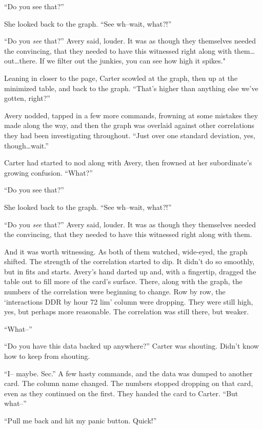 ``Do you see that?''

She looked back to the graph. ``See wh--wait, what?!''

``Do you \emph{see} that?'' Avery said, louder. It was as though they themselves needed the convincing, that they needed to have this witnessed right along with them\ldots{}out\ldots{}there. If we filter out the junkies, you can see how high it spikes."

Leaning in closer to the page, Carter scowled at the graph, then up at the minimized table, and back to the graph. ``That's higher than anything else we've gotten, right?''

Avery nodded, tapped in a few more commands, frowning at some mistakes they made along the way, and then the graph was overlaid against other correlations they had been investigating throughout. ``Just over one standard deviation, yes, though\ldots{}wait.''

Carter had started to nod along with Avery, then frowned at her subordinate's growing confusion. ``What?''

``Do you see that?''

She looked back to the graph. ``See wh--wait, what?!''

``Do you \emph{see} that?'' Avery said, louder. It was as though they themselves needed the convincing, that they needed to have this witnessed right along with them.

And it was worth witnessing. As both of them watched, wide-eyed, the graph shifted. The strength of the correlation started to dip. It didn't do so smoothly, but in fits and starts. Avery's hand darted up and, with a fingertip, dragged the table out to fill more of the card's surface. There, along with the graph, the numbers of the correlation were beginning to change. Row by row, the `interactions DDR by hour 72 lim' column were dropping. They were still high, yes, but perhaps more reasonable. The correlation was still there, but weaker.

``What--''

``Do you have this data backed up anywhere?'' Carter was shouting. Didn't know how to keep from shouting.

``I-- maybe. Sec.'' A few hasty commands, and the data was dumped to another card. The column name changed. The numbers stopped dropping on that card, even as they continued on the first. They handed the card to Carter. ``But what--''

``Pull me back and hit my panic button. Quick!''

